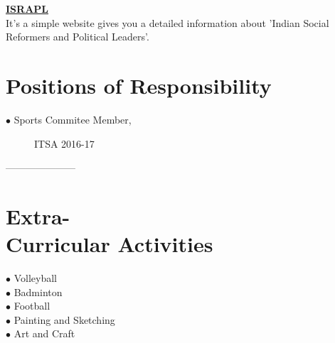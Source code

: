\documentclass[margin,line]{res}
\newenvironment{list2}{
  \begin{list}{$\bullet$}{%
      \setlength{\itemsep}{0in}
      \setlength{\parsep}{0in} \setlength{\parskip}{0in}
      \setlength{\topsep}{0in} \setlength{\partopsep}{0in}
      \setlength{\leftmargin}{0.2in}}}{\end{list}}
\begin{document}
\begin{resume}
\href{https://github.com/PurveshMakode24/ISRAPL}{\bf ISRAPL}\\
It's a simple website gives you a detailed information about 'Indian Social Reformers and Political Leaders'.\\


\section{\sc Positions of Responsibility}
 
 \begin{description}
  \item[$\bullet$ Sports Commitee Member,]  ITSA 2016-17
 
\end{description}

---------------------

\section{\sc Extra-\\Curricular Activities}
  \begin{description}
   \item[$\bullet$ Volleyball]
   \item[$\bullet$ Badminton]
   \item[$\bullet$ Football]
   \item[$\bullet$ Painting and Sketching]
   \item[$\bullet$ Art and Craft]
\end{description}



\iffalse
\section{\sc Publications}

\begin{list2}
\item LastName Author1, First initial., LastName Author2, First initial.,  "Title",{\em Where published}, Date
\item LastName Author1, First initial., LastName Author2, First initial.,  "Title",{\em Where published}, Date
\end{list2}


\section{\sc References }
Available upon request.
\fi
\end{resume}
\end{document}
